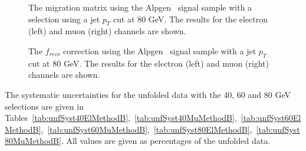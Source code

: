 \begin{figure}[htbp]
\centering
{}
\caption{The migration matrix using the Alpgen  \ttbar\ signal sample with a selection using a jet $p_T$ cut at 80 GeV.  The results for the electron (left) and muon (right) channels are shown.}
\label{fig:MethodBmigration80}
\end{figure}

\begin{figure}[htbp]
\centering
{}
\caption{The $f_{reco}$ correction using the Alpgen  \ttbar\ signal sample with a jet $p_T$ cut at 80 GeV.  The results for the electron (left) and muon (right) channels are shown.}
\label{fig:MethodBfreco80}
\end{figure}

The systematic uncertainties for the unfolded data with the 40, 60 and 80 GeV
selections are given in Tables~\ref{tab:unfSyst40ElMethodB},~\ref{tab:unfSyst40MuMethodB},~\ref{tab:unfSyst60ElMethodB},~\ref{tab:unfSyst60MuMethodB},~\ref{tab:unfSyst80ElMethodB},~\ref{tab:unfSyst80MuMethodB}. All values are given as percentages of the unfolded data.

\clearpage










\clearpage


